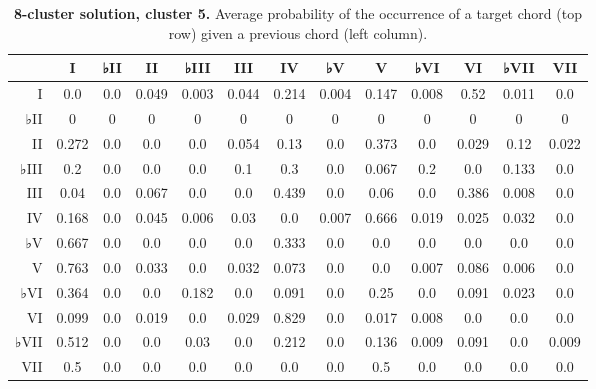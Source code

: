 \begin{table}[htbp]
\begin{minipage}{\linewidth}
\setlength{\tymax}{0.5\linewidth}
\centering
\small
\caption{\textbf{8-cluster solution, cluster 5.} Average probability of the occurrence of a target chord (top row) given a previous chord (left column).}
\label{8-clustersolutioncluster5.averageprobabilityoftheoccurrenceofatargetchordtoprowgivenapreviouschordleftcolumn.}
\begin{tabulary}{\textwidth}{@{}RCCCCCCCCCCCC@{}} \toprule
&I&♭II&II&♭III&III&IV&♭V&V&♭VI&VI&♭VII&VII\\
\midrule
I&0.0&0.0&0.049&0.003&0.044&0.214&0.004&0.147&0.008&0.52&0.011&0.0\\
♭II&0&0&0&0&0&0&0&0&0&0&0&0\\
II&0.272&0.0&0.0&0.0&0.054&0.13&0.0&0.373&0.0&0.029&0.12&0.022\\
♭III&0.2&0.0&0.0&0.0&0.1&0.3&0.0&0.067&0.2&0.0&0.133&0.0\\
III&0.04&0.0&0.067&0.0&0.0&0.439&0.0&0.06&0.0&0.386&0.008&0.0\\
IV&0.168&0.0&0.045&0.006&0.03&0.0&0.007&0.666&0.019&0.025&0.032&0.0\\
♭V&0.667&0.0&0.0&0.0&0.0&0.333&0.0&0.0&0.0&0.0&0.0&0.0\\
V&0.763&0.0&0.033&0.0&0.032&0.073&0.0&0.0&0.007&0.086&0.006&0.0\\
♭VI&0.364&0.0&0.0&0.182&0.0&0.091&0.0&0.25&0.0&0.091&0.023&0.0\\
VI&0.099&0.0&0.019&0.0&0.029&0.829&0.0&0.017&0.008&0.0&0.0&0.0\\
♭VII&0.512&0.0&0.0&0.03&0.0&0.212&0.0&0.136&0.009&0.091&0.0&0.009\\
VII&0.5&0.0&0.0&0.0&0.0&0.0&0.0&0.5&0.0&0.0&0.0&0.0\\

\bottomrule

\end{tabulary}
\end{minipage}
\end{table}


